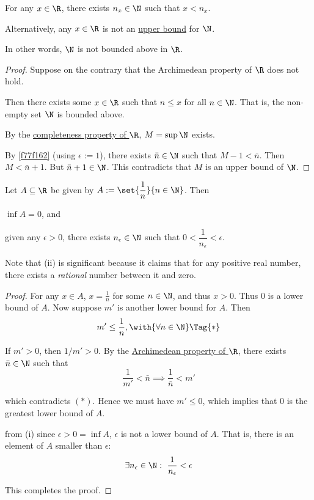 \label{fbc2289}

For any $x\in\R$, there exists $n_x\in\N$ such that $x<n_x$.

Alternatively, any $x\in\R$ is not an \href{e4698be}{upper bound} for $\N$.

In other words, $\N$ is not bounded above in $\R$.

\begin{proof}
  Suppose on the contrary that the Archimedean property of $\R$ does not hold.

  Then there exists some $x\in\R$ such that $n\leq x$ for all $n\in\N$. That
  is, the non-empty set $\N$ is bounded above.

  By the \href{f330cf9}{completeness property of $\R$}, $M=\sup\N$ exists.

  By \autoref{f77f162} (using $\epsilon:=1$), there exists $\bar n\in\N$ such
  that $M-1<\bar n$. Then $M<\bar n+1$. But $\bar n+1\in\N$. This contradicts
  that $M$ is an upper bound of $\N$.
\end{proof}

\label{d845856}

Let $A\subseteq\R$ be given by $A:=\set{\dfrac1n}{n\in\N}$. Then
\begin{enumerati}
  \item $\inf A=0$, and
  \item given any $\epsilon>0$, there exists $n_\epsilon\in\N$ such that
        $0<\dfrac1{n_\epsilon}<\epsilon$.
\end{enumerati}

Note that (ii) is significant because it claims that for any positive real
number, there exists a \textit{rational} number between it and zero.

\begin{proof}
   For any $x\in A$, $x=\frac1n$ for some $n\in\N$, and thus $x>0$.
  Thus $0$ is a lower bound of $A$. Now suppose $m'$ is another lower bound for
  $A$. Then
  \begin{equation*}
    m'\leq\frac1n,\with{\forall n\in\N}\Tag{*}
  \end{equation*}

  If $m'>0$, then $1/m'>0$. By the \href{fbc2289}{Archimedean property of
  $\R$}, there exists $\bar n\in\N$ such that
  $$
    \frac1{m'}<\bar n\implies\frac1{\bar n}<m'
  $$

  which contradicts $(*)$. Hence we must have $m'\leq0$, which implies that 0
  is the greatest lower bound of $A$.

   from (i) since $\epsilon>0=\inf A$, $\epsilon$ is not a lower
  bound of $A$. That is, there is an element of $A$ smaller than $\epsilon$:
  $$
    \exists n_\epsilon\in\N:\ \frac1{n_\epsilon}<\epsilon
  $$

  This completes the proof.
\end{proof}

